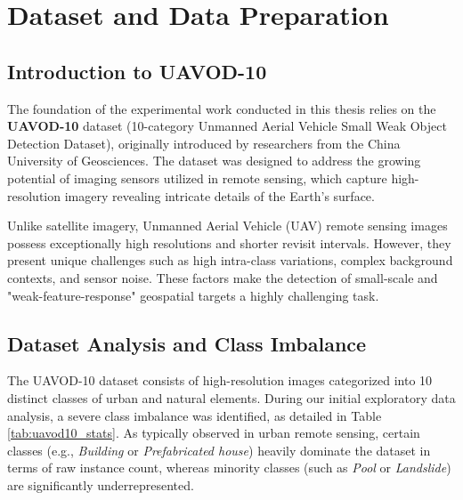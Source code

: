 
\chapter{Dataset and Data Preparation}
\label{ch:dataset}

\section{Introduction to UAVOD-10}
The foundation of the experimental work conducted in this thesis relies on the \textbf{UAVOD-10} dataset (10-category Unmanned Aerial Vehicle Small Weak Object Detection Dataset), originally introduced by researchers from the China University of Geosciences. 
The dataset was designed to address the growing potential of imaging sensors utilized in remote sensing, which capture high-resolution imagery revealing intricate details of the Earth's surface. 

Unlike satellite imagery, Unmanned Aerial Vehicle (UAV) remote sensing images possess exceptionally high resolutions and shorter revisit intervals. However, they present unique challenges such as high intra-class variations, complex background contexts, and sensor noise. These factors make the detection of small-scale and "weak-feature-response" geospatial targets a highly challenging task.

\section{Dataset Analysis and Class Imbalance}
The UAVOD-10 dataset consists of high-resolution images categorized into 10 distinct classes of urban and natural elements. During our initial exploratory data analysis, a severe class imbalance was identified, as detailed in Table \ref{tab:uavod10_stats}. 
As typically observed in urban remote sensing, certain classes (e.g., \textit{Building} or \textit{Prefabricated house}) heavily dominate the dataset in terms of raw instance count, whereas minority classes (such as \textit{Pool} or \textit{Landslide}) are significantly underrepresented.

